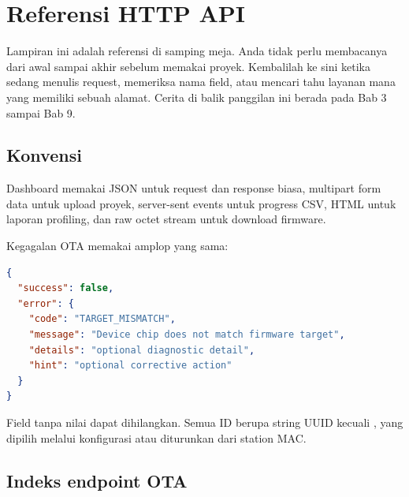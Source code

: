 \chapter{Referensi HTTP API}

Lampiran ini adalah referensi di samping meja. Anda tidak perlu membacanya dari awal sampai akhir sebelum memakai proyek. Kembalilah ke sini ketika sedang menulis request, memeriksa nama field, atau mencari tahu layanan mana yang memiliki sebuah alamat. Cerita di balik panggilan ini berada pada Bab 3 sampai Bab 9.

\section{Konvensi}

Dashboard memakai JSON untuk request dan response biasa, multipart form data untuk upload proyek, server-sent events untuk progress CSV, HTML untuk laporan profiling, dan raw octet stream untuk download firmware.

Kegagalan OTA memakai amplop yang sama:

\begin{lstlisting}[language=JSON,numbers=none]
{
  "success": false,
  "error": {
    "code": "TARGET_MISMATCH",
    "message": "Device chip does not match firmware target",
    "details": "optional diagnostic detail",
    "hint": "optional corrective action"
  }
}
\end{lstlisting}

Field tanpa nilai dapat dihilangkan. Semua ID berupa string UUID kecuali , yang dipilih melalui konfigurasi atau diturunkan dari station MAC.

\section{Indeks endpoint OTA}

